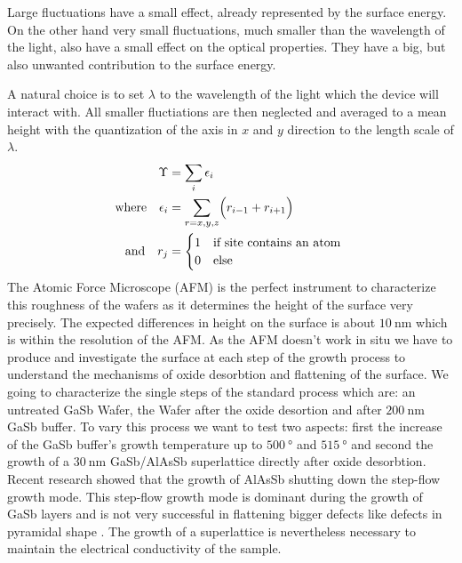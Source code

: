 %

Large fluctuations have a small effect, already represented by the surface 
energy. On the other hand very small fluctuations, much smaller than the 
wavelength of the light, also have a small effect on the optical properties.  
They have a big, but also unwanted contribution to the surface energy.

A natural choice is to set $\lambda$ to the wavelength of the light which the 
device will interact with. All smaller fluctiations are then neglected and 
averaged to a mean height with the quantization of the axis in $x$ and $y$ 
direction to the length scale of $\lambda$.
\begin{align}
    \Upsilon &=  \sum_i \epsilon_i \hfill ~ \\
    \text{where} \quad 
    \epsilon_i &=  \sum_{r=x,y,z} \Bigl( r_{i-1} + r_{i+1} \Bigr) \\
    \text{and}  \quad 
    r_j &=    \begin{cases}
                1 &\mbox{if site contains an atom } \\
                0 &\mbox{else }
            \end{cases}
\end{align}
The Atomic Force Microscope (AFM) is the perfect instrument to characterize this roughness of the wafers as it determines the height of the surface very precisely. The expected differences in height on the surface is about $\SI{10}{\nano\meter}$ which is within the resolution of the AFM.
As the AFM doesn't work in situ we have to produce and investigate the surface at each step of the growth process to understand the mechanisms of oxide desorbtion and flattening of the surface. We going to characterize the single steps of the standard process which are: an untreated GaSb Wafer, the Wafer after the oxide desortion and after $\SI{200}{\nano\meter}$ GaSb buffer. To vary this process we want to test two aspects: first the increase of the GaSb buffer's growth temperature up to $\SI{500}{\degree}$ and $\SI{515}{\degree}$ and second the growth of a $\SI{30}{\nano\meter}$ GaSb/AlAsSb superlattice directly after oxide desorbtion. Recent research showed that the growth of AlAsSb shutting down the step-flow growth mode. This  step-flow growth mode is dominant during the growth of GaSb layers and is not very successful in flattening bigger defects like defects in pyramidal shape \cite{murray}. The growth of a superlattice is nevertheless necessary to maintain the electrical conductivity of the sample.\\
